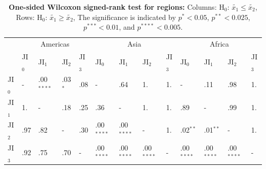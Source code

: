 			\begin{table}[ht]
				\centering
				\caption[One-sided Wilcoxon signed-rank test for regions]{\textbf{One-sided Wilcoxon signed-rank test for regions:} Columns: H$_0$: $\tilde{x_1}\leq\tilde{x_2}$, Rows: H$_0$: $\tilde{x_1}\geq\tilde{x_2}$, The significance is indicated by $p^{*}<0.05$, $p^{**}<0.025$, $p^{***}<0.01$, and $p^{****}<0.005$.}
				\label{tab:wilcoxononesided_regions}
				\begin{tabular}{lllllllllllll}
					\hline
					& \multicolumn{4}{c}{Americas} & \multicolumn{4}{c}{Asia} & \multicolumn{4}{c}{Africa} \\
					& JI$_0$ & JI$_1$ & JI$_2$ & JI$_3$ & JI$_0$ & JI$_1$ & JI$_2$ & JI$_3$ & JI$_0$ & JI$_1$ & JI$_2$ & JI$_3$ \\\hline
					JI$_0$ & - & .00$^{****}$ & .03$^{*}$ & .08 & - & .64 & 1. & 1. & - & .11 & .98 & 1. \\
					JI$_1$ & 1. & - & .18 & .25 & .36 & - & 1. & 1. & .89 & - & .99 & 1. \\
					JI$_2$ & .97 & .82 & - & .30 & .00$^{****}$ & .00$^{****}$ & - & 1. & .02$^{**}$ & .01$^{**}$ & - & 1. \\
					JI$_3$ & .92 & .75 & .70 & - & .00$^{****}$ & .00$^{****}$ & .00$^{****}$ & - & .00$^{****}$ & .00$^{****}$ & .00$^{****}$ & - \\\hline
				\end{tabular}
			\end{table}
 
